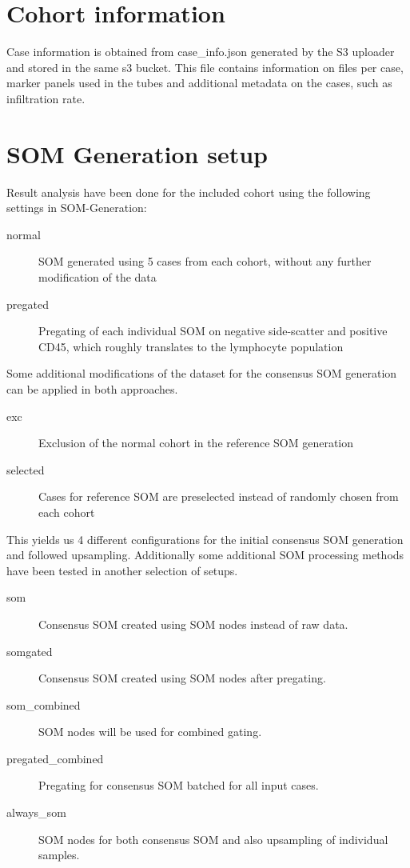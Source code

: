 \documentclass[11pt,a4paper]{article}
\begin{document}
\section{Cohort information}

Case information is obtained from case\_info.json generated by the S3 uploader and stored in the same s3 bucket.
This file contains information on files per case, marker panels used in the tubes and additional metadata on the cases, such as infiltration rate.





\section{SOM Generation setup}

Result analysis have been done for the included cohort using the following settings in SOM-Generation:

\begin{description}
   \item[normal] SOM generated using 5 cases from each cohort, without any further modification of the data
   \item[pregated] Pregating of each individual SOM on negative side-scatter and positive CD45, which roughly translates to the lymphocyte population
\end{description}

Some additional modifications of the dataset for the consensus SOM generation can be applied in both approaches.

\begin{description}
   \item[exc] Exclusion of the normal cohort in the reference SOM generation
   \item[selected] Cases for reference SOM are preselected instead of randomly chosen from each cohort
\end{description}

This yields us 4 different configurations for the initial consensus SOM generation and followed upsampling.
Additionally some additional SOM processing methods have been tested in another selection of setups.

\begin{description}
   \item[som] Consensus SOM created using SOM nodes instead of raw data.
   \item[somgated] Consensus SOM created using SOM nodes after pregating.
   \item[som\_combined] SOM nodes will be used for combined gating.
   \item[pregated\_combined] Pregating for consensus SOM batched for all input cases.
   \item[always\_som] SOM nodes for both consensus SOM and also upsampling of individual samples.
\end{description}
\end{document}
